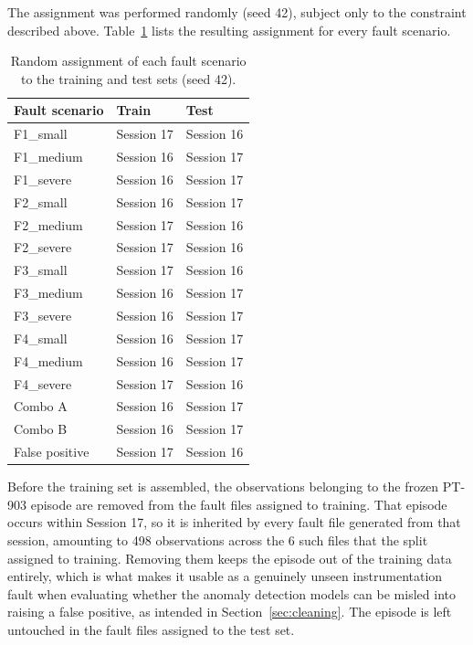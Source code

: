 The assignment was performed randomly (seed 42), subject only to the constraint described above. 
Table~\ref{tab:fault_split} lists the resulting assignment for every fault scenario.

\begin{table}[htbp]
\centering
\caption{Random assignment of each fault scenario to the training and test sets (seed 42).}
\label{tab:fault_split}
\small
\begin{tabular}{lll}
\hline
\textbf{Fault scenario} & \textbf{Train} & \textbf{Test} \\
\hline
F1\_small   & Session 17 & Session 16 \\
F1\_medium  & Session 16 & Session 17 \\
F1\_severe  & Session 16 & Session 17 \\
F2\_small   & Session 16 & Session 17 \\
F2\_medium  & Session 17 & Session 16 \\
F2\_severe  & Session 17 & Session 16 \\
F3\_small   & Session 17 & Session 16 \\
F3\_medium  & Session 16 & Session 17 \\
F3\_severe  & Session 16 & Session 17 \\
F4\_small   & Session 16 & Session 17 \\
F4\_medium  & Session 16 & Session 17 \\
F4\_severe  & Session 17 & Session 16 \\
Combo A     & Session 16 & Session 17 \\
Combo B     & Session 16 & Session 17 \\
False positive & Session 17 & Session 16 \\
\hline
\end{tabular}
\end{table}

Before the training set is assembled, the observations belonging to the frozen PT-903 episode are removed 
from the fault files assigned to training. That episode occurs within Session 17, so it is inherited by 
every fault file generated from that session, amounting to 498 observations across the 6 such files that 
the split assigned to training. Removing them keeps the episode out of the training data entirely, which 
is what makes it usable as a genuinely unseen instrumentation fault when evaluating whether the anomaly 
detection models can be misled into raising a false positive, as intended in Section~\ref{sec:cleaning}. 
The episode is left untouched in the fault files assigned to the test set.

